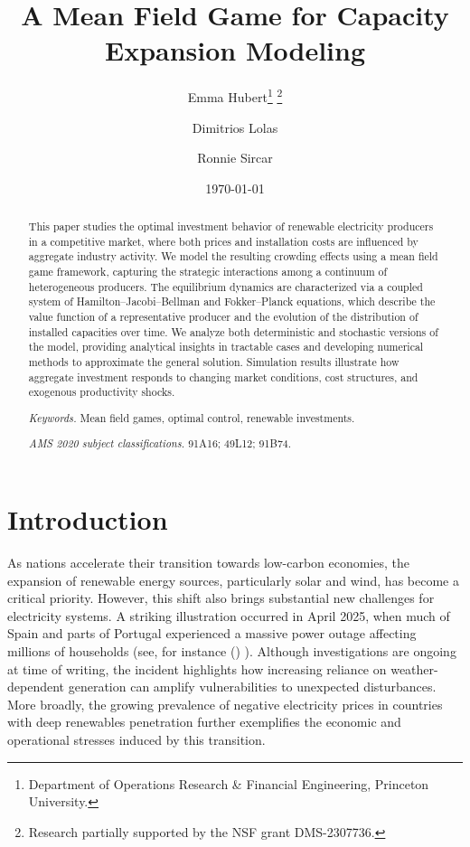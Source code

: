 \documentclass[12pt]{article}
\title{A Mean Field Game for Capacity Expansion Modeling}
\author{Emma Hubert\thanks{Department of Operations Research \& Financial Engineering, Princeton University.} \thanks{Research partially supported by the NSF grant DMS-2307736.} \and Dimitrios Lolas\footnotemark[1] \and Ronnie Sircar\footnotemark[1]}
\date{\today}
\newcommand\citeayn[2][]{\citeauthor*{#2} (\citeyear{#2}) \cite[#1]{#2}}
\begin{document}
\maketitle

\begin{abstract}
This paper studies the optimal investment behavior of renewable electricity producers in a competitive market, where both prices and installation costs are influenced by aggregate industry activity. We model the resulting crowding effects using a mean field game framework, capturing the strategic interactions among a continuum of heterogeneous producers. The equilibrium dynamics are characterized via a coupled system of Hamilton--Jacobi--Bellman and Fokker--Planck equations, which describe the value function of a representative producer and the evolution of the distribution of installed capacities over time. We analyze both deterministic and stochastic versions of the model, providing analytical insights in tractable cases and developing numerical methods to approximate the general solution. Simulation results illustrate how aggregate investment responds to changing market conditions, cost structures, and exogenous productivity shocks. 

\bigskip
\noindent
\textit{Keywords.} Mean field games, optimal control, renewable investments. 

\medskip
\noindent
\textit{AMS 2020 subject classifications.} 91A16; 49L12; 91B74.


\end{abstract}


\section{Introduction}

As nations accelerate their transition towards low-carbon economies, the expansion of renewable energy sources, particularly solar and wind, has become a critical priority. However, this shift also brings substantial new challenges for electricity systems. 
A striking illustration occurred in April 2025, when much of Spain and parts of Portugal experienced a massive power outage affecting millions of households (see, for instance \citeayn{bajo-buenestado2025iberian}). Although investigations are ongoing at time of writing, the incident highlights how increasing reliance on weather-dependent generation can amplify vulnerabilities to unexpected disturbances. More broadly, the growing prevalence of negative electricity prices in countries with deep renewables penetration further exemplifies the economic and operational stresses induced by this transition. 
\end{document}
